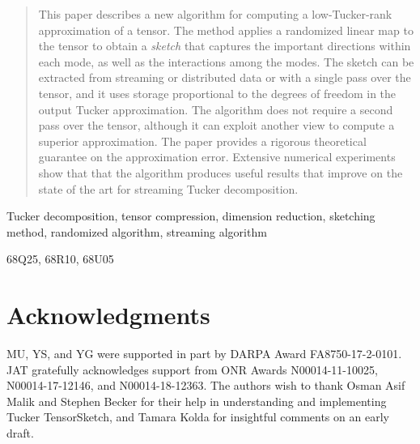 \documentclass[review,onefignum,onetabnum]{siamart171218}
\begin{document}
\maketitle
\begin{abstract}
This paper describes a new algorithm for computing a low-Tucker-rank approximation of a tensor.
The method applies a randomized linear map to the tensor to obtain a \emph{sketch}
that captures the important directions within each mode, as well as the interactions among the modes.
The sketch can be extracted from streaming or distributed data or with a single pass over the tensor,
and it uses storage proportional to the degrees of freedom in the output Tucker approximation.
The algorithm does not require a second pass over the tensor, although it can exploit another view
to compute a superior approximation. The paper provides a rigorous theoretical guarantee
on the approximation error. Extensive numerical experiments show that that the algorithm
produces useful results that improve on the state of the art for streaming Tucker decomposition.
\end{abstract}


\begin{keywords}
Tucker decomposition, tensor compression, dimension reduction, sketching method, randomized algorithm, streaming algorithm
\end{keywords}

\begin{AMS}
  68Q25, 68R10, 68U05
\end{AMS}





% 
\section*{Acknowledgments}
MU, YS, and YG were supported in part by DARPA Award FA8750-17-2-0101.
JAT gratefully acknowledges support from ONR Awards N00014-11-10025, N00014-17-12146, and N00014-18-12363.
The authors wish to thank Osman Asif Malik and Stephen Becker for their help
in understanding and implementing Tucker TensorSketch,
and Tamara Kolda for insightful comments on an early draft.

\clearpage



\appendix

\end{document}
